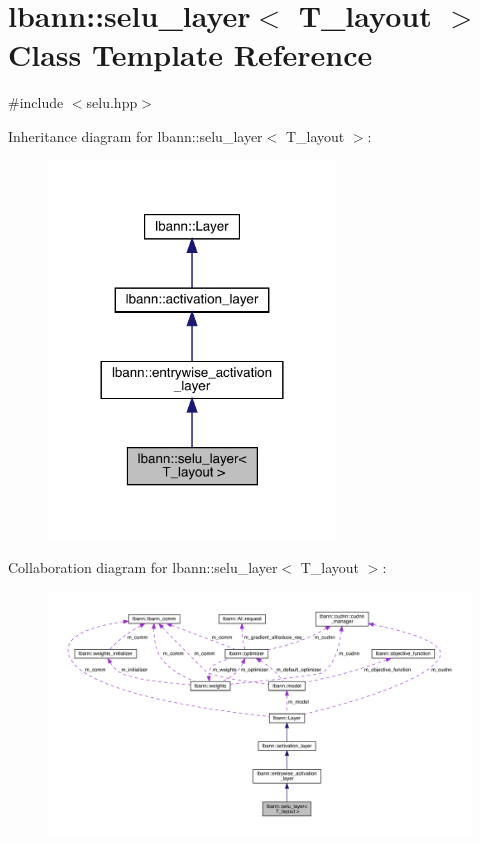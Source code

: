 \hypertarget{classlbann_1_1selu__layer}{}\section{lbann\+:\+:selu\+\_\+layer$<$ T\+\_\+layout $>$ Class Template Reference}
\label{classlbann_1_1selu__layer}


{\ttfamily \#include $<$selu.\+hpp$>$}



Inheritance diagram for lbann\+:\+:selu\+\_\+layer$<$ T\+\_\+layout $>$\+:\nopagebreak
\begin{figure}[H]
\begin{center}
\leavevmode
\includegraphics[width=216pt]{classlbann_1_1selu__layer__inherit__graph}
\end{center}
\end{figure}


Collaboration diagram for lbann\+:\+:selu\+\_\+layer$<$ T\+\_\+layout $>$\+:\nopagebreak
\begin{figure}[H]
\begin{center}
\leavevmode
\includegraphics[width=350pt]{classlbann_1_1selu__layer__coll__graph}
\end{center}
\end{figure}
